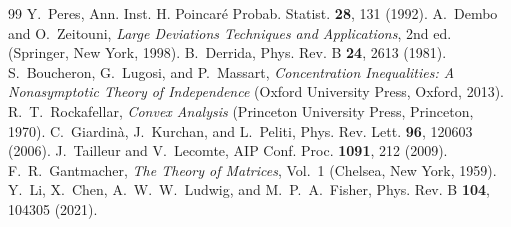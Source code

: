 \documentclass[aps,prx,reprint,superscriptaddress,nobibnotes,longbibliography]{revtex4-2}
\theoremstyle{remark}
\begin{document}
\begin{thebibliography}{99}
 Y.~Peres, Ann. Inst. H. Poincar\'e Probab. Statist. \textbf{28}, 131 (1992).
 A.~Dembo and O.~Zeitouni, \emph{Large Deviations Techniques and Applications}, 2nd ed. (Springer, New York, 1998).
 B.~Derrida, Phys. Rev. B \textbf{24}, 2613 (1981).
 S.~Boucheron, G.~Lugosi, and P.~Massart, \emph{Concentration Inequalities: A Nonasymptotic Theory of Independence} (Oxford University Press, Oxford, 2013).
 R.~T.~Rockafellar, \emph{Convex Analysis} (Princeton University Press, Princeton, 1970).
 C.~Giardin\`a, J.~Kurchan, and L.~Peliti, Phys. Rev. Lett. \textbf{96}, 120603 (2006).
 J.~Tailleur and V.~Lecomte, AIP Conf. Proc. \textbf{1091}, 212 (2009).
 F.~R.~Gantmacher, \emph{The Theory of Matrices}, Vol.~1 (Chelsea, New York, 1959).
 Y.~Li, X.~Chen, A.~W.~W.~Ludwig, and M.~P.~A.~Fisher, Phys. Rev. B \textbf{104}, 104305 (2021).
\end{thebibliography}
\end{document}
